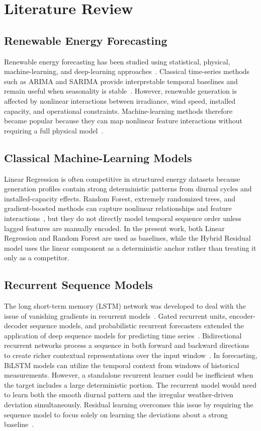 \documentclass{ieeeaccess}
\begin{document}
\section{Literature Review}
\subsection{Renewable Energy Forecasting}
Renewable energy forecasting has been studied using statistical, physical, machine-learning, and deep-learning approaches~\cite{voyant,inman,antonanzas,diagne,sobri,foley,hahn,wang_bilstm_access,dl_timeseries_access}. Classical time-series methods such as ARIMA and SARIMA provide interpretable temporal baselines and remain useful when seasonality is stable~\cite{box,hyndman}. However, renewable generation is affected by nonlinear interactions between irradiance, wind speed, installed capacity, and operational constraints. Machine-learning methods therefore became popular because they can map nonlinear feature interactions without requiring a full physical model~\cite{ahmad,mellit,jung}.

\subsection{Classical Machine-Learning Models}
Linear Regression is often competitive in structured energy datasets because generation profiles contain strong deterministic patterns from diurnal cycles and installed-capacity effects. Random Forest, extremely randomized trees, and gradient-boosted methods can capture nonlinear relationships and feature interactions~\cite{breiman,geurts,friedman,chen,ke}, but they do not directly model temporal sequence order unless lagged features are manually encoded. In the present work, both Linear Regression and Random Forest are used as baselines, while the Hybrid Residual model uses the linear component as a deterministic anchor rather than treating it only as a competitor.

\subsection{Recurrent Sequence Models}
The long short-term memory (LSTM) network was developed to deal with the issue of vanishing gradients in recurrent models~\cite{hochreiter}. Gated recurrent units, encoder-decoder sequence models, and probabilistic recurrent forecasters extended the application of deep sequence models for predicting time series~\cite{cho,sutskever,salinas}. Bidirectional recurrent networks process a sequence in both forward and backward directions to create richer contextual representations over the input window~\cite{schuster}. In forecasting, BiLSTM models can utilize the temporal context from windows of historical measurements. However, a standalone recurrent learner could be inefficient when the target includes a large deterministic portion. The recurrent model would need to learn both the smooth diurnal pattern and the irregular weather-driven deviation simultaneously. Residual learning overcomes this issue by requiring the sequence model to focus solely on learning the deviations about a strong baseline~\cite{he,oreshkin,lai,chen_residual_access}.
\end{document}
